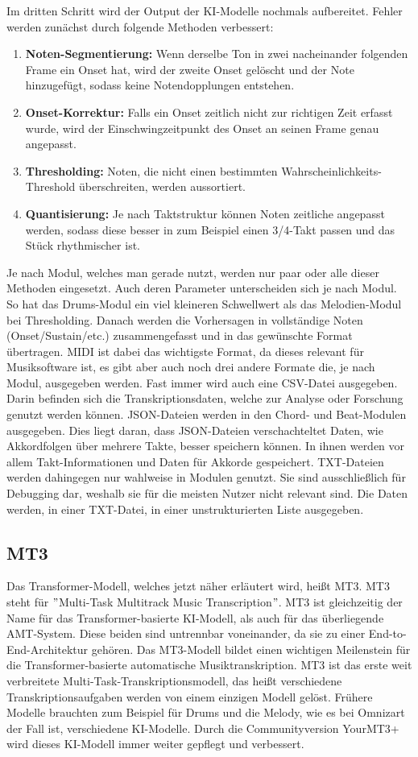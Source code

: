 Im dritten Schritt wird der Output der KI-Modelle nochmals aufbereitet.
Fehler werden zunächst durch folgende Methoden verbessert:
\begin{enumerate}
    \item \textbf{Noten-Segmentierung:} Wenn derselbe Ton in zwei nacheinander folgenden Frame ein Onset hat, wird der zweite Onset gelöscht und der Note hinzugefügt, sodass keine Notendopplungen entstehen.
    \item \textbf{Onset-Korrektur:} Falls ein Onset zeitlich nicht zur richtigen Zeit erfasst wurde, wird der Einschwingzeitpunkt des Onset an seinen Frame genau angepasst.
    \item \textbf{Thresholding:} Noten, die nicht einen bestimmten Wahrscheinlichkeits-Threshold überschreiten, werden aussortiert.
    \item \textbf{Quantisierung:} Je nach Taktstruktur können Noten zeitliche angepasst werden, sodass diese besser in zum Beispiel einen 3/4-Takt passen und das Stück rhythmischer ist.
\end{enumerate}
Je nach Modul, welches man gerade nutzt, werden nur paar oder alle dieser Methoden eingesetzt.
Auch deren Parameter unterscheiden sich je nach Modul.
So hat das Drums-Modul ein viel kleineren Schwellwert als das Melodien-Modul bei Thresholding.
Danach werden die Vorhersagen in vollständige Noten (Onset/Sustain/etc.)
zusammengefasst und in das gewünschte Format übertragen.
MIDI ist dabei das wichtigste Format, da dieses relevant für Musiksoftware ist,
es gibt aber auch noch drei andere Formate die, je nach Modul, ausgegeben werden.
Fast immer wird auch eine CSV-Datei ausgegeben.
Darin befinden sich die Transkriptionsdaten, welche zur Analyse oder Forschung genutzt werden können.
JSON-Dateien werden in den Chord- und Beat-Modulen ausgegeben.
Dies liegt daran, dass JSON-Dateien verschachteltet Daten, wie Akkordfolgen über mehrere Takte, besser speichern können.
In ihnen werden vor allem Takt-Informationen und Daten für Akkorde gespeichert.
TXT-Dateien werden dahingegen nur wahlweise in Modulen genutzt.
Sie sind ausschließlich für Debugging dar, weshalb sie für die meisten Nutzer nicht relevant sind.
Die Daten werden, in einer TXT-Datei, in einer unstrukturierten Liste ausgegeben.

\subsection{MT3}
Das Transformer-Modell, welches jetzt näher erläutert wird, heißt MT3.
MT3 steht für \("\)Multi-Task Multitrack Music Transcription\("\).
MT3 ist gleichzeitig der Name für das Transformer-basierte KI-Modell, als auch für das überliegende AMT-System.
Diese beiden sind untrennbar voneinander, da sie zu einer End-to-End-Architektur gehören.
Das MT3-Modell bildet einen wichtigen Meilenstein für die Transformer-basierte automatische Musiktranskription.
MT3 ist das erste weit verbreitete Multi-Task-Transkriptionsmodell,
das heißt verschiedene Transkriptionsaufgaben werden von einem einzigen Modell gelöst.
Frühere Modelle brauchten zum Beispiel für Drums und die Melody,
wie es bei Omnizart der Fall ist, verschiedene KI-Modelle.
Durch die Communityversion YourMT3+ wird dieses KI-Modell immer weiter gepflegt und verbessert.

